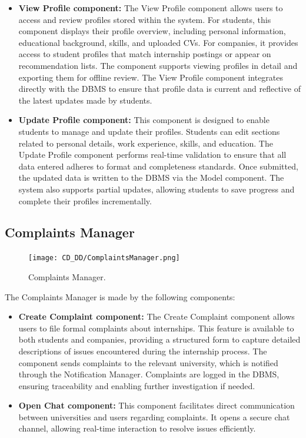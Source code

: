 \begin{itemize}
    \item \textbf{View Profile component:} The View Profile component allows users to access and review profiles stored within the system. For students, this component displays their profile overview, including personal information, educational background, skills, and uploaded CVs. For companies, it provides access to student profiles that match internship postings or appear on recommendation lists. The component supports viewing profiles in detail and exporting them for offline review. The View Profile component integrates directly with the DBMS to ensure that profile data is current and reflective of the latest updates made by students.
    \item \textbf{Update Profile component:} This component is designed to enable students to manage and update their profiles. Students can edit sections related to personal details, work experience, skills, and education. The Update Profile component performs real-time validation to ensure that all data entered adheres to format and completeness standards. Once submitted, the updated data is written to the DBMS via the Model component. The system also supports partial updates, allowing students to save progress and complete their profiles incrementally.
\end{itemize}

\subsection{Complaints Manager}
\label{subsec:complaints_manager}%

\begin{figure}[H]
    \begin{center}
        \texttt{[image: CD\_DD/ComplaintsManager.png]}
        \caption{Complaints Manager.}
        \label{fig:complaints_manager}%
    \end{center}
\end{figure}

\noindent The Complaints Manager is made by the following components:

\begin{itemize}
    \item \textbf{Create Complaint component:} The Create Complaint component allows users to file formal complaints about internships. This feature is available to both students and companies, providing a structured form to capture detailed descriptions of issues encountered during the internship process. The component sends complaints to the relevant university, which is notified through the Notification Manager. Complaints are logged in the DBMS, ensuring traceability and enabling further investigation if needed.
    \item \textbf{Open Chat component:} This component facilitates direct communication between universities and users regarding complaints. It opens a secure chat channel, allowing real-time interaction to resolve issues efficiently.
\end{itemize}

